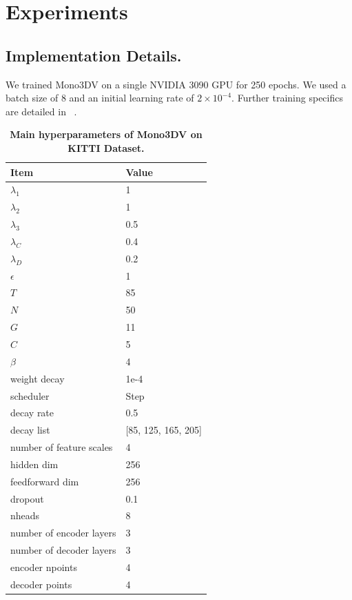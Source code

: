 \section{Experiments}
\subsection{Implementation Details.}
We trained Mono3DV on a single NVIDIA 3090 GPU for 250 epochs. We used a batch size of 8 and an initial learning rate of $2 \times 10^{-4}$. Further training specifics are detailed in ~.

\begin{table}[h!]
    \centering
    \caption{\textbf{Main hyperparameters of Mono3DV on KITTI Dataset.}}
    \begin{tabular}{ll}
         \toprule
         \textbf{Item} & \textbf{Value} \\
         \midrule
         $\lambda_1$ & 1  \\
         $\lambda_2$ & 1 \\
         $\lambda_3$ & 0.5 \\
         $\lambda_C$ & 0.4 \\
         $\lambda_D$ & 0.2 \\
         $\epsilon$ & 1 \\
         $T$ & 85 \\
         $N$ & 50 \\
         $G$ & 11\\
         $C$ & 5 \\
         $\beta$ & 4\\
         weight decay & 1e-4\\
         scheduler & Step \\
         decay rate & 0.5 \\
         decay list & [85, 125, 165, 205] \\
         number of feature scales & 4 \\
         hidden dim & 256 \\
         feedforward dim & 256 \\
         dropout & 0.1 \\
         nheads & 8 \\
        number of encoder layers & 3 \\
        number of decoder layers & 3 \\
         encoder npoints  & 4 \\
         decoder points & 4\\
         \bottomrule
    \end{tabular}
    \label{tab:hyper}
\end{table}

